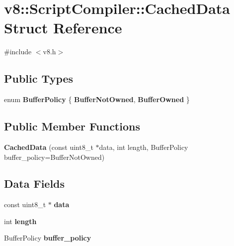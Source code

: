 \hypertarget{structv8_1_1ScriptCompiler_1_1CachedData}{}\section{v8\+:\+:Script\+Compiler\+:\+:Cached\+Data Struct Reference}
\label{structv8_1_1ScriptCompiler_1_1CachedData}


{\ttfamily \#include $<$v8.\+h$>$}

\subsection*{Public Types}
\begin{DoxyCompactItemize}
\item 
\hypertarget{structv8_1_1ScriptCompiler_1_1CachedData_ac1a1055d361e89b589c3fa98b79b9c25}{}enum {\bfseries Buffer\+Policy} \{ {\bfseries Buffer\+Not\+Owned}, 
{\bfseries Buffer\+Owned}
 \}\label{structv8_1_1ScriptCompiler_1_1CachedData_ac1a1055d361e89b589c3fa98b79b9c25}

\end{DoxyCompactItemize}
\subsection*{Public Member Functions}
\begin{DoxyCompactItemize}
\item 
\hypertarget{structv8_1_1ScriptCompiler_1_1CachedData_ab45b2bd22aa86eafd0b8eecbdc72d44e}{}{\bfseries Cached\+Data} (const uint8\+\_\+t $\ast$data, int length, Buffer\+Policy buffer\+\_\+policy=Buffer\+Not\+Owned)\label{structv8_1_1ScriptCompiler_1_1CachedData_ab45b2bd22aa86eafd0b8eecbdc72d44e}

\end{DoxyCompactItemize}
\subsection*{Data Fields}
\begin{DoxyCompactItemize}
\item 
\hypertarget{structv8_1_1ScriptCompiler_1_1CachedData_a31e313a969170116f98d5a76c110fe61}{}const uint8\+\_\+t $\ast$ {\bfseries data}\label{structv8_1_1ScriptCompiler_1_1CachedData_a31e313a969170116f98d5a76c110fe61}

\item 
\hypertarget{structv8_1_1ScriptCompiler_1_1CachedData_ad7b8b1b672095a2c33621d3d5b5c7f8f}{}int {\bfseries length}\label{structv8_1_1ScriptCompiler_1_1CachedData_ad7b8b1b672095a2c33621d3d5b5c7f8f}

\item 
\hypertarget{structv8_1_1ScriptCompiler_1_1CachedData_a1e5c9ff625ac790139aec4294493fe32}{}Buffer\+Policy {\bfseries buffer\+\_\+policy}\label{structv8_1_1ScriptCompiler_1_1CachedData_a1e5c9ff625ac790139aec4294493fe32}

\end{DoxyCompactItemize}


